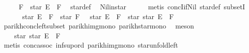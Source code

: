 \begin{isabellebody}
%
\isadelimproof
%
\endisadelimproof
%
\isatagproof
{}\isamarkupfalse%
\ {\isacharminus}{\kern0pt}\isanewline
\ \ \isamarkupfalse%
\ {\isachardoublequoteopen}F\ {\isasymsubseteq}\ star\ E\ {\isacharat}{\kern0pt}{\isacharat}{\kern0pt}\ F{\isachardoublequoteclose}\ \isamarkupfalse%
\ star{\isacharunderscore}{\kern0pt}def\ \isamarkupfalse%
\ Nil{\isacharunderscore}{\kern0pt}in{\isacharunderscore}{\kern0pt}star\isanewline
\ \ \ \ \isamarkupfalse%
\ {\isacharparenleft}{\kern0pt}metis\ concI{\isacharunderscore}{\kern0pt}if{\isacharunderscore}{\kern0pt}Nil{}\ star{\isacharunderscore}{\kern0pt}def\ subsetI{\isacharparenright}{\kern0pt}\isanewline
\ \ \isamarkupfalse%
\ \isamarkupfalse%
\ {\isachardoublequoteopen}{\isasymPsi}\ {\isacharparenleft}{\kern0pt}star\ E\ {\isacharat}{\kern0pt}{\isacharat}{\kern0pt}\ F\ {\isacharat}{\kern0pt}{\isacharat}{\kern0pt}\ star\ F{\isacharparenright}{\kern0pt}\ {\isasymsubseteq}\ {\isasymPsi}\ {\isacharparenleft}{\kern0pt}star\ E\ {\isacharat}{\kern0pt}{\isacharat}{\kern0pt}\ F\ {\isacharat}{\kern0pt}{\isacharat}{\kern0pt}\ star\ {\isacharparenleft}{\kern0pt}star\ E\ {\isacharat}{\kern0pt}{\isacharat}{\kern0pt}\ F{\isacharparenright}{\kern0pt}{\isacharparenright}{\kern0pt}{\isachardoublequoteclose}\isanewline
\ \ \ \ \isamarkupfalse%
\ parikh{\isacharunderscore}{\kern0pt}conc{\isacharunderscore}{\kern0pt}left{\isacharunderscore}{\kern0pt}subset\ parikh{\isacharunderscore}{\kern0pt}img{\isacharunderscore}{\kern0pt}mono\ parikh{\isacharunderscore}{\kern0pt}star{\isacharunderscore}{\kern0pt}mono\ \isamarkupfalse%
\ meson\isanewline
\ \ \isamarkupfalse%
\ \isamarkupfalse%
\ {\isachardoublequoteopen}{\isasymdots}\ {\isasymsubseteq}\ {\isasymPsi}\ {\isacharparenleft}{\kern0pt}star\ {\isacharparenleft}{\kern0pt}star\ E\ {\isacharat}{\kern0pt}{\isacharat}{\kern0pt}\ F{\isacharparenright}{\kern0pt}{\isacharparenright}{\kern0pt}{\isachardoublequoteclose}\isanewline
\ \ \ \ \isamarkupfalse%
\ {\isacharparenleft}{\kern0pt}metis\ conc{\isacharunderscore}{\kern0pt}assoc\ inf{\isacharunderscore}{\kern0pt}sup{\isacharunderscore}{\kern0pt}ord{\isacharparenleft}{\kern0pt}{}{\isacharparenright}{\kern0pt}\ parikh{\isacharunderscore}{\kern0pt}img{\isacharunderscore}{\kern0pt}mono\ star{\isacharunderscore}{\kern0pt}unfold{\isacharunderscore}{\kern0pt}left{\isacharparenright}{\kern0pt}\isanewline

\end{isabellebody}

